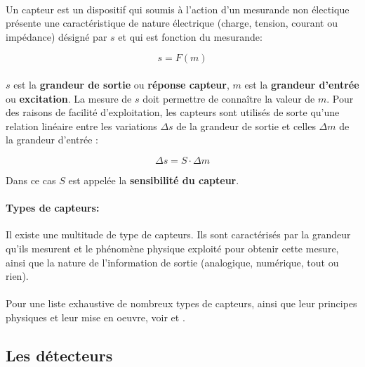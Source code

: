 \documentclass[12pt,a4paper]{report}
\begin{document}
\paragraph{}Un capteur est un dispositif qui soumis à l'action d'un mesurande non électique présente une caractéristique de nature électrique (charge, tension, courant ou impédance) désigné par $s$ et qui est fonction du mesurande:

\begin{equation}
	s = F(m)
\end{equation}

\paragraph{} $s$ est la \textbf{grandeur de sortie} ou \textbf{réponse capteur}, $m$ est la \textbf{grandeur d'entrée} ou \textbf{excitation}. La mesure de $s$ doit permettre de connaître la valeur de $m$. Pour des raisons de facilité d'exploitation, les capteurs sont utilisés de sorte qu'une relation linéaire entre les variations $\varDelta s$ de la grandeur de sortie et celles $\varDelta m$ de la grandeur d'entrée :

\begin{equation}
	\varDelta s = S \cdot \varDelta m
\end{equation}

Dans ce cas $S$ est appelée la \textbf{sensibilité du capteur}. 

\paragraph{Types de capteurs:} Il existe une multitude de type de capteurs. Ils sont caractérisés par la grandeur qu'ils mesurent et le phénomène physique exploité pour obtenir cette mesure, ainsi que la nature de l'information de sortie (analogique, numérique, tout ou rien).

\paragraph{} Pour une liste exhaustive de nombreux types de capteurs, ainsi que leur principes physiques et leur mise en oeuvre, voir \cite{asch_les_2010} et \cite{fraden_handbook_2004}.

\subsection{Les détecteurs}
\end{document}
